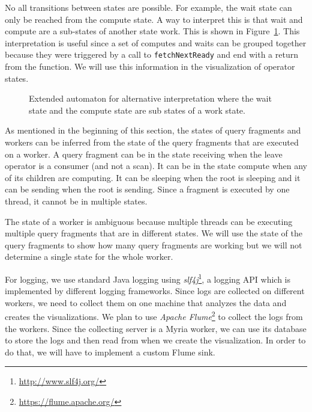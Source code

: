 \documentclass[11pt]{article}
\begin{document}
No all transitions between states are possible. For example, the wait state can only be reached from the compute state. A way to interpret this is that wait and compute are a sub-states of another state work. This is shown in Figure~\ref{fig:extd_compute}. This interpretation is useful since a set of computes and waits can be grouped together because they were triggered by a call to \texttt{fetchNextReady} and end with a return from the function. We will use this information in the visualization of operator states.

\begin{figure}[h]
  \begin{center}
    \def\svgwidth{0.35\columnwidth}
    
  \end{center}
  \caption{Extended automaton for alternative interpretation where the wait state and the compute state are sub states of a work state.}
  \label{fig:extd_compute}
\end{figure}

As mentioned in the beginning of this section, the states of query fragments and workers can be inferred from the state of the query fragments that are executed on a worker. A query fragment can be in the state receiving when the leave operator is a consumer (and not a scan). It can be in the state compute when any of its children are computing. It can be sleeping when the root is sleeping and it can be sending when the root is sending. Since a fragment is executed by one thread, it cannot be in multiple states.

The state of a worker is ambiguous because multiple threads can be executing multiple query fragments that are in different states. We will use the state of the query fragments to show how many query fragments are working but we will not determine a single state for the whole worker.


For logging, we use standard Java logging using \emph{slf4j}\footnote{\url{http://www.slf4j.org/}}, a logging API which is implemented by different logging frameworks. Since logs are collected on different workers, we need to collect them on one machine that analyzes the data and creates the visualizations. We plan to use \emph{Apache Flume}\footnote{\url{https://flume.apache.org/}} to collect the logs from the workers. Since the collecting server is a Myria worker, we can use its database to store the logs and then read from when we create the visualization. In order to do that, we will have to implement a custom Flume sink.
\end{document}
